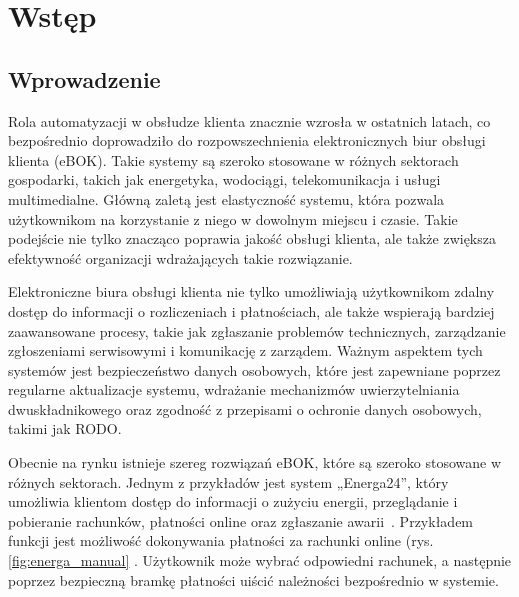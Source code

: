 \chapter{Wstęp}
\section{Wprowadzenie}
Rola automatyzacji w obsłudze klienta znacznie wzrosła w ostatnich latach, co bezpośrednio doprowadziło do rozpowszechnienia elektronicznych biur obsługi klienta (eBOK).
Takie systemy są szeroko stosowane w różnych sektorach gospodarki, takich jak energetyka, wodociągi, telekomunikacja i usługi multimedialne. Główną zaletą jest elastyczność systemu, która pozwala użytkownikom na korzystanie z niego w dowolnym miejscu i czasie. Takie podejście nie tylko znacząco poprawia jakość obsługi klienta, ale także zwiększa efektywność organizacji wdrażających takie rozwiązanie.

Elektroniczne biura obsługi klienta nie tylko umożliwiają użytkownikom zdalny dostęp do informacji o rozliczeniach i płatnościach, ale także wspierają bardziej zaawansowane procesy, takie jak zgłaszanie problemów technicznych, zarządzanie zgłoszeniami serwisowymi i komunikację z zarządem. Ważnym aspektem tych systemów jest bezpieczeństwo danych osobowych, które jest zapewniane poprzez regularne aktualizacje systemu, wdrażanie mechanizmów uwierzytelniania dwuskładnikowego oraz zgodność z przepisami o ochronie danych osobowych, takimi jak RODO.

Obecnie na rynku istnieje szereg rozwiązań eBOK, które są szeroko stosowane w różnych sektorach. Jednym z przykładów jest system „Energa24”, który umożliwia klientom dostęp do informacji o zużyciu energii, przeglądanie i pobieranie rachunków, płatności online oraz zgłaszanie awarii~\cite{energa}. Przykładem funkcji jest możliwość dokonywania płatności za rachunki online (rys. \ref{fig:energa_manual} . Użytkownik może wybrać odpowiedni rachunek, a następnie poprzez bezpieczną bramkę płatności uiścić należności bezpośrednio w systemie.

